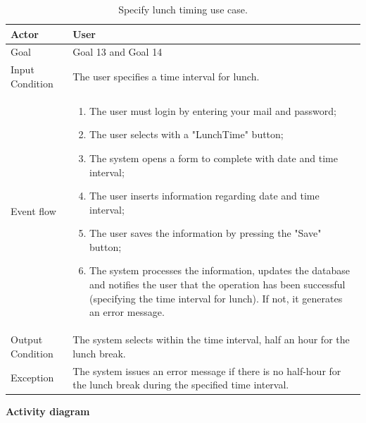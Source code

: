 \documentclass{article}
\begin{document}
	\begin{table}[htp]
	\caption{Specify lunch timing use case.}
		\begin{center}
    			\begin{tabular}{p{}|p{}}
   			 	\hline
    				Actor & User \\ \hline
    				Goal & Goal 13 and Goal 14 \\ \hline
    				Input Condition & The user specifies a time interval for lunch. \\ \hline
    				Event flow & 
				\begin{enumerate}
  					\item The user must login by entering your mail and password;
  					\item The user selects with a "LunchTime" button;
  					\item The system opens a form to complete with date and time interval;
  					\item The user inserts information regarding date and time interval;
  					\item The user saves the information by pressing the "Save" button;
  					\item The system processes the information, updates the database and notifies the user that the operation has been successful (specifying the time interval for lunch). If not, it generates an error message.
 				 \end{enumerate} \\ \hline
    				Output Condition & The system selects within the time interval, half an hour for the lunch break. \\ \hline
    				Exception & The system issues an error message if there is no half-hour for the lunch break during the specified time interval. \\ \hline
    			\end{tabular}
		\end{center}
	\end{table}
	
	\bigskip
	\noindent
	\textbf{Activity diagram} \\
	
\end{document}
